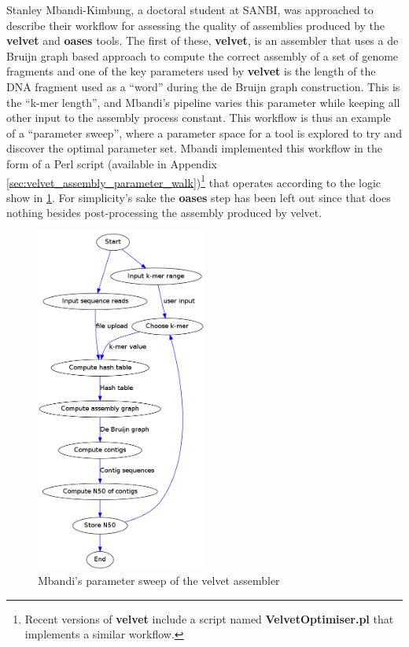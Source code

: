 \documentclass[a4paper,10pt]{scrreprt}
\begin{document}
Stanley Mbandi-Kimbung, a doctoral student at SANBI, was approached to describe their workflow for assessing the quality of assemblies produced by the \textbf{velvet} \cite{zerbino_velvet:_2008} and \textbf{oases} \cite{schulz_oases:_2012} tools. The first of these, \textbf{velvet}, is an assembler that uses a de Bruijn graph based approach to compute the correct assembly of a set of genome fragments and one of the key parameters used by \textbf{velvet} is the length of the DNA fragment used as a ``word'' during the de Bruijn graph construction. This is the ``k-mer length'', and Mbandi's pipeline varies this parameter while keeping all other input to the assembly process constant. This workflow is thus an example of a ``parameter sweep'', where a parameter space for a tool is explored to try and discover the optimal parameter set. Mbandi implemented this workflow in the form of a Perl script (available in Appendix \ref{sec:velvet_assembly_parameter_walk})\footnote{Recent versions of \textbf{velvet} include a 
script named \textbf{VelvetOptimiser.pl} that implements a similar workflow.} that operates according to the logic show in \ref{fig:oases_parameter_walk}. For simplicity's sake the \textbf{oases} step has been left out since that does nothing besides post-processing the assembly produced by velvet.

\begin{figure}[!htb]
\centering
\includegraphics[width=0.5\textwidth]{images/oases_parameter_walk}
\caption{Mbandi's parameter sweep of the velvet assembler}
\label{fig:oases_parameter_walk}
\end{figure}
\end{document}
